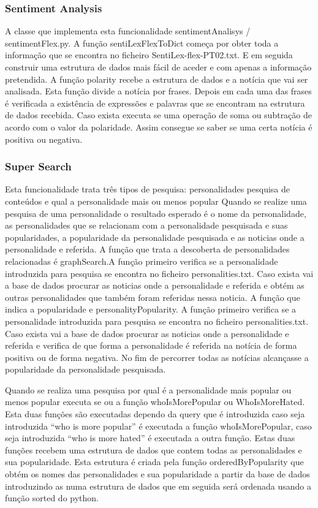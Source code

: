 \documentclass{acm_proc_article-sp}
\begin{document}
\subsubsection{Sentiment Analysis}
A classe que implementa esta funcionalidade sentimentAnalisys / sentimentFlex.py.
A função sentiLexFlexToDict começa por obter toda a informação que se encontra no ficheiro SentiLex-flex-PT02.txt. 
E em seguida construir uma estrutura de dados mais fácil de aceder e com apenas a informação pretendida.
A função polarity recebe a estrutura de dados e a notícia que vai ser analisada. 
Esta função divide a notícia por frases. 
Depois em cada uma das frases é verificada a existência de expressões e palavras que se encontram na estrutura de dados recebida. 
Caso exista executa se uma operação de soma ou subtração de acordo com o valor da polaridade. 
Assim consegue se saber se uma certa notícia é positiva ou negativa.


\subsubsection{Super Search}
Esta funcionalidade trata três tipos de pesquisa: personalidades pesquisa de conteúdos e qual a personalidade mais ou menos popular
Quando se realize uma pesquisa de uma personalidade o resultado esperado é o nome da personalidade, as personalidades que se relacionam com a personalidade pesquisada e suas popularidades, a popularidade da personalidade pesquisada e as noticias onde a personalidade e referida.
A função que trata a descoberta de personalidades relacionadas é graphSearch.A função primeiro verifica se a personalidade introduzida para pesquisa se encontra no ficheiro
personalities.txt. Caso exista vai a base de dados procurar as noticias onde a personalidade e referida e obtém as outras personalidades que também foram referidas nessa noticia.
A função que indica a popularidade e personalityPopularity. A função primeiro verifica se a personalidade introduzida para pesquisa se encontra no ficheiro personalities.txt. Caso exista vai a base de dados procurar as noticias onde a personalidade e referida e verifica de que forma a personalidade é referida na notícia de forma positiva ou de forma negativa. No fim de percorrer todas as notícias alcançasse a popularidade da personalidade pesquisada.

Quando se realiza uma pesquisa por qual é a personalidade mais popular ou menos popular executa se ou a função whoIsMorePopular ou WhoIsMoreHated. 
Esta duas funções são executadas dependo da query que é introduzida caso seja introduzida “who is more popular” é executada a função whoIsMorePopular, caso seja introduzida “who is more hated” é executada a outra função. 
Estas duas funções recebem uma estrutura de dados que contem todas as personalidades e sua popularidade. 
Esta estrutura é criada pela função orderedByPopularity que obtém os nomes das personalidades e sua popularidade a partir da base de dados introduzindo as numa estrutura de dados que em seguida será ordenada usando a função sorted do python.
\end{document}
